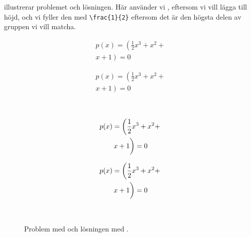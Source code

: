 \documentclass[lang=sv,ptsize=10pt,font=none,nomath,titles=bf,../../a4.tex]{subfiles}
\begin{document}
 illustrerar problemet och lösningen. Här använder
vi , eftersom vi vill lägga till höjd, och vi fyller den med
\verb|\frac{1}{2}| eftersom det är den högsta delen av gruppen vi vill
matcha.

\begin{figure}[tbp]
	\centering
	\begin{minipage}{\textwidth}
		\begin{minipage}{0.4\textwidth} %
			\begin{multline}
				p(x) = \left(\frac{1}{2}x^3 + x^2 + \right. \\
				\left. x + 1 \right) = 0
			\end{multline}
		\end{minipage}
		\hfill
		\begin{minipage}{0.55\textwidth} %
\begin{latexcode}
\begin{multline}
p(x) = \left(\frac{1}{2}x^3 +
     x^2 + \right. \\
\left. x + 1 \right) = 0
\end{multline}
\end{latexcode}
		\end{minipage}
	\end{minipage}\\
	\begin{minipage}{\textwidth}
		\begin{minipage}{0.4\textwidth} %
			\begin{multline}
				p(x) = \left(\frac{1}{2}x^3 + x^2 + \right. \\
				\left. x + 1 \vphantom{\frac{1}{2}}\right) = 0
			\end{multline}
		\end{minipage}
		\hfill
		\begin{minipage}{0.55\textwidth} %
\begin{latexcode}
\begin{multline}
p(x) = \left(\frac{1}{2}x^3 +
     x^2 + \right. \\
\left. x + 1 \vphantom{
\frac{1}{2} }\right) = 0
\end{multline}
\end{latexcode}
		\end{minipage}
	\end{minipage}\\
	\caption{Problem med  och lösningen med .}
	\label{fig:phantom}
\end{figure}
\end{document}
